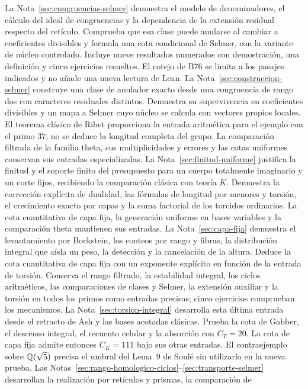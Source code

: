 La Nota~\ref{sec:congruencias-selmer} demuestra el modelo de
denominadores, el cálculo del ideal de congruencias y la dependencia
de la extensión residual respecto del retículo. Comprueba que esa
clase puede anularse al cambiar a coeficientes divisibles y formula
una cota condicional de Selmer, con la variante de núcleo controlado.
Incluye nueve resultados numerados con demostración, una definición
y cinco ejercicios resueltos. El cotejo de B76 se limita a los
pasajes indicados y no añade una nueva lectura de Lean.
La Nota~\ref{sec:construccion-selmer} construye una clase de
anulador exacto desde una congruencia de rango dos con caracteres
residuales distintos. Demuestra su supervivencia en coeficientes
divisibles y un mapa a Selmer cuyo núcleo se calcula con vectores
propios locales. El teorema clásico de Ribet proporciona la entrada
aritmética para el ejemplo con el primo $37$; no se deduce la
longitud completa del grupo. La comparación filtrada de la familia
theta, sus multiplicidades y errores y las cotas uniformes conservan
sus entradas especializadas.
La Nota~\ref{sec:finitud-uniforme} justifica la finitud y el soporte
finito del presupuesto para un cuerpo totalmente imaginario y un
corte fijos, recibiendo la comparación clásica con teoría $K$.
Demuestra la corrección explícita de dualidad, las fórmulas de
longitud por menores y torsión, el crecimiento exacto por capas
y la suma factorial de los torcidos ordinarios.
La cota cuantitativa de capa fija, la generación uniforme en
bases variables y la comparación theta mantienen sus entradas.
La Nota~\ref{sec:capa-fija} demuestra el levantamiento por
Bockstein, los conteos por rango y fibras, la distribución
integral que aísla un peso, la detección y la cancelación de
la altura. Deduce la cota cuantitativa de capa fija con un
exponente explícito en función de la entrada de torsión.
Conserva el rango filtrado, la estabilidad integral, los
ciclos aritméticos, las comparaciones de clases y Selmer,
la extensión auxiliar y la torsión en todos los primos
como entradas precisas; cinco ejercicios comprueban los mecanismos.
La Nota~\ref{sec:torsion-integral} desarrolla esta última entrada
desde el retracto de Ash y las bases acotadas clásicas.
Prueba la cota de Gabber, el descenso integral, el recuento
celular y la absorción con $C_T=20$.
La cota de capa fija admite entonces $C_K=111$ bajo sus
otras entradas. El contraejemplo sobre $\mathbb{Q}(\sqrt5)$ precisa
el umbral del Lema~9 de Soulé sin utilizarlo en la nueva prueba.
Las Notas~\ref{sec:rango-homologico-ciclos}--\ref{sec:transporte-selmer}
desarrollan la realización por retículos y prismas, la comparación de
